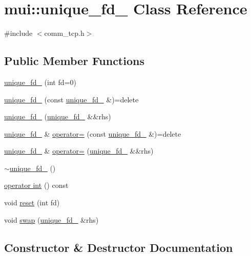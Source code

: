 \hypertarget{classmui_1_1unique__fd__}{}\section{mui\+:\+:unique\+\_\+fd\+\_\+ Class Reference}
\label{classmui_1_1unique__fd__}


{\ttfamily \#include $<$comm\+\_\+tcp.\+h$>$}

\subsection*{Public Member Functions}
\begin{DoxyCompactItemize}
\item 
\hyperlink{classmui_1_1unique__fd___ae1547f4faa80a92d5ba128145fd0d23c}{unique\+\_\+fd\+\_\+} (int fd=0)
\item 
\hyperlink{classmui_1_1unique__fd___a1983b90c521ab7233f32da1a85ad5962}{unique\+\_\+fd\+\_\+} (const \hyperlink{classmui_1_1unique__fd__}{unique\+\_\+fd\+\_\+} \&)=delete
\item 
\hyperlink{classmui_1_1unique__fd___af118889b2bb1910bacb3492c5b2db640}{unique\+\_\+fd\+\_\+} (\hyperlink{classmui_1_1unique__fd__}{unique\+\_\+fd\+\_\+} \&\&rhs)
\item 
\hyperlink{classmui_1_1unique__fd__}{unique\+\_\+fd\+\_\+} \& \hyperlink{classmui_1_1unique__fd___a1fd99552abbebadb6c2822bb26738e3e}{operator=} (const \hyperlink{classmui_1_1unique__fd__}{unique\+\_\+fd\+\_\+} \&)=delete
\item 
\hyperlink{classmui_1_1unique__fd__}{unique\+\_\+fd\+\_\+} \& \hyperlink{classmui_1_1unique__fd___abca4e10942091e7a391796b3fcf72568}{operator=} (\hyperlink{classmui_1_1unique__fd__}{unique\+\_\+fd\+\_\+} \&\&rhs)
\item 
\hyperlink{classmui_1_1unique__fd___aac237c669eb9111d5169d607414408f1}{$\sim$unique\+\_\+fd\+\_\+} ()
\item 
\hyperlink{classmui_1_1unique__fd___a664f9e13594fe958816ad6994bbe533c}{operator int} () const
\item 
void \hyperlink{classmui_1_1unique__fd___aa7c178fe9dfc3932edd08bd9d863139e}{reset} (int fd)
\item 
void \hyperlink{classmui_1_1unique__fd___ae76b65f5ece4d1670923f78de93f04e9}{swap} (\hyperlink{classmui_1_1unique__fd__}{unique\+\_\+fd\+\_\+} \&rhs)
\end{DoxyCompactItemize}


\subsection{Constructor \& Destructor Documentation}
\mbox{\label{classmui_1_1unique__fd___ae1547f4faa80a92d5ba128145fd0d23c}} 
